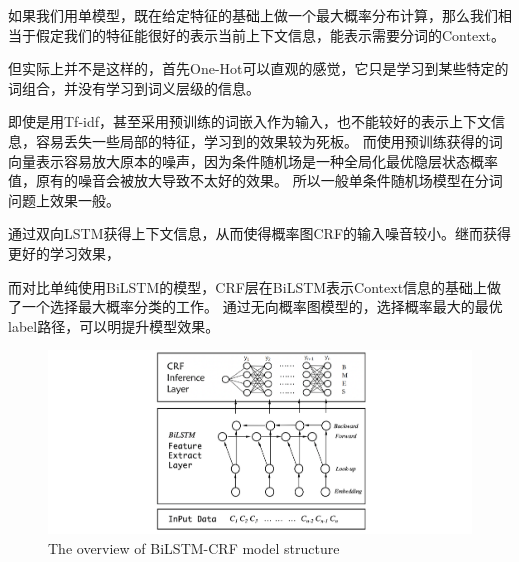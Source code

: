 如果我们用单模型，既在给定特征的基础上做一个最大概率分布计算，那么我们相当于假定我们的特征能很好的表示当前上下文信息，能表示需要分词的Context。

但实际上并不是这样的，首先One-Hot可以直观的感觉，它只是学习到某些特定的词组合，并没有学习到词义层级的信息。

即使是用Tf-idf，甚至采用预训练的词嵌入作为输入，也不能较好的表示上下文信息，容易丢失一些局部的特征，学习到的效果较为死板。
而使用预训练获得的词向量表示容易放大原本的噪声，因为条件随机场是一种全局化最优隐层状态概率值，原有的噪音会被放大导致不太好的效果。
所以一般单条件随机场模型在分词问题上效果一般。

通过双向LSTM获得上下文信息，从而使得概率图CRF的输入噪音较小。继而获得更好的学习效果，

而对比单纯使用BiLSTM的模型，CRF层在BiLSTM表示Context信息的基础上做了一个选择最大概率分类的工作。
通过无向概率图模型的，选择概率最大的最优label路径，可以明提升模型效果。


\begin{figure}[htbp!]
    \begin{center}
    \includegraphics[width=1\textwidth]{figures/model.pdf}
    \end{center}
    \caption{The overview of BiLSTM-CRF model structure}
    \label{fig:overall_model}
\end{figure}